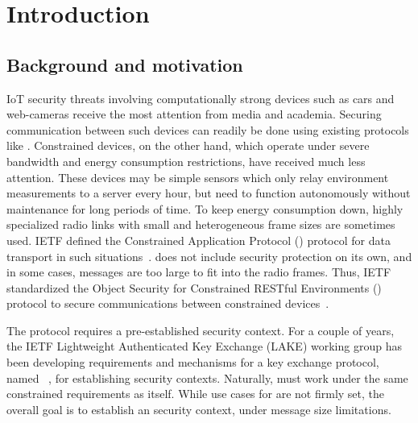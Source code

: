 \documentclass[runningheads, envcountsame, a4paper, draft, x11names]{llncs}
\begin{document}

\section{Introduction}
\label{sec:introduction}

\subsection{Background and motivation}
\label{sec:motivation}
IoT security threats involving computationally strong devices such as cars
and web-cameras receive the most attention from media and academia.
%
Securing communication between such devices can readily be done using existing
protocols like \mDandTls.
%
Constrained devices, on the other hand, which operate under severe bandwidth
and energy consumption restrictions, have received much less attention.
%
These devices may be simple sensors which only relay environment
measurements to a server every hour, but need to function autonomously without
maintenance for long periods of time.
%
To keep energy consumption down, highly specialized radio links with small
and heterogeneous frame sizes are sometimes used.
%
IETF defined the Constrained Application Protocol (\mCoap{}) protocol for data
transport in such situations~\cite{rfc7252}.
%
\mCoap{} does not include security protection on its own, and in some cases,
\mDandTls{} messages are too large to fit into the radio frames.
%
Thus, IETF standardized the Object Security for Constrained RESTful Environments
(\mOscore{}) protocol to secure communications between constrained
devices~\cite{rfc8613}.
%

The \mOscore{} protocol requires a pre-established security context.
%
For a couple of years, the IETF Lightweight Authenticated Key Exchange (LAKE)
working group has been developing requirements and mechanisms for a key
exchange protocol, named \mEdhoc~\cite{selander-lake-edhoc-01}, for
establishing \mOscore{} security contexts.
%
Naturally, \mEdhoc{} must work under the same constrained requirements as
\mOscore{} itself.
%
While use cases for \mEdhoc{} are not firmly set, the overall goal is to
establish an \mOscore{} security context, under message size limitations.
%
\end{document}
